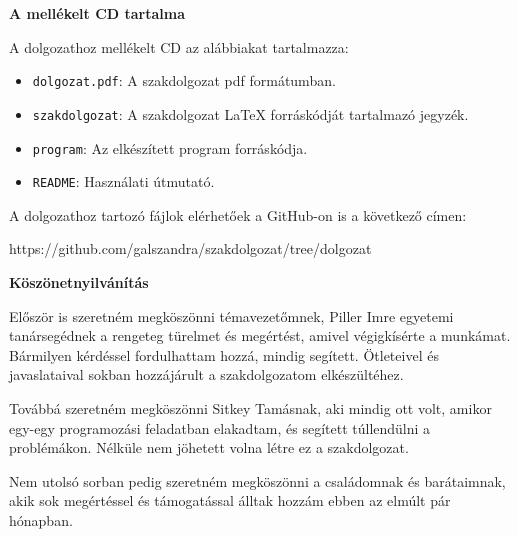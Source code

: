 \pagestyle{empty}

\noindent \textbf{\Large A mellékelt CD tartalma}

\vskip 1cm

A dolgozathoz mellékelt CD az alábbiakat tartalmazza:

\begin{itemize}
\item\texttt{dolgozat.pdf}: A szakdolgozat pdf formátumban.
\item\texttt{szakdolgozat}: A szakdolgozat LaTeX forráskódját tartalmazó jegyzék.
\item\texttt{program}: Az elkészített program forráskódja. 
\item\texttt{README}: Használati útmutató.
\end{itemize}

A dolgozathoz tartozó fájlok elérhetőek a GitHub-on is a következő címen:

https://github.com/galszandra/szakdolgozat/tree/dolgozat

\newpage

\begin{LARGE}
	\textbf{Köszönetnyilvánítás}
\end{LARGE}
\vskip 1cm

Először is szeretném megköszönni témavezetőmnek, Piller Imre egyetemi tanársegédnek a rengeteg türelmet és megértést, amivel végigkísérte a munkámat. Bármilyen kérdéssel fordulhattam hozzá, mindig segített. Ötleteivel és javaslataival sokban hozzájárult a szakdolgozatom elkészültéhez.

Továbbá szeretném megköszönni Sitkey Tamásnak, aki mindig ott volt, amikor egy-egy programozási feladatban elakadtam, és segített túllendülni a problémákon. Nélküle nem jöhetett volna létre ez a szakdolgozat.

Nem utolsó sorban pedig szeretném megköszönni a családomnak és barátaimnak, akik sok megértéssel és támogatással álltak hozzám ebben az elmúlt pár hónapban.